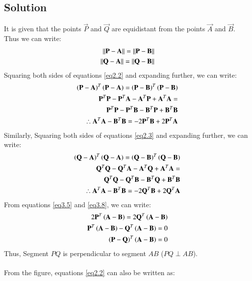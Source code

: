 \documentclass[journal,12pt,twocolumn]{IEEEtran}
\begin{document}
\subsection{Solution}
\noindent It is given that the points $\vec{P}$ and $\vec{Q}$  are equidistant from the points $\vec{A}$ and $\vec{B}$. Thus we can write:
\begin{align}
    \left\lVert\mathbf{P}-\mathbf{A}\right\rVert=\left\lVert\mathbf{P}-\mathbf{B}\right\rVert \label{eq2.2}\\
    \left\lVert\mathbf{Q}-\mathbf{A}\right\rVert=\left\lVert\mathbf{Q}-\mathbf{B}\right\rVert \label{eq2.3}
\end{align}
Squaring both sides of equations \ref{eq2.2} and expanding further, we can write:
\begin{align}
    \left(\mathbf{P}-\mathbf{A}\right)^T\left(\mathbf{P}-\mathbf{A}\right)=\left(\mathbf{P}-\mathbf{B}\right)^T\left(\mathbf{P}-\mathbf{B}\right) \\
    \mathbf{P}^T\mathbf{P}-\mathbf{P}^T\mathbf{A}-\mathbf{A}^T\mathbf{P}+\mathbf{A}^T\mathbf{A}= \nonumber \\ 
     \mathbf{P}^T\mathbf{P}-\mathbf{P}^T\mathbf{B}-\mathbf{B}^T\mathbf{P}+\mathbf{B}^T\mathbf{B} \\
     \therefore \mathbf{A}^T\mathbf{A}-\mathbf{B}^T\mathbf{B}=-2\mathbf{P}^T\mathbf{B}+2\mathbf{P}^T\mathbf{A}\label{eq3.5}
\end{align}
Similarly, Squaring both sides of equations \ref{eq2.3} and expanding further, we can write:
\begin{align}
    \left(\mathbf{Q}-\mathbf{A}\right)^T\left(\mathbf{Q}-\mathbf{A}\right)=\left(\mathbf{Q}-\mathbf{B}\right)^T\left(\mathbf{Q}-\mathbf{B}\right) \\
    \mathbf{Q}^T\mathbf{Q}-\mathbf{Q}^T\mathbf{A}-\mathbf{A}^T\mathbf{Q}+\mathbf{A}^T\mathbf{A}= \nonumber \\ 
     \mathbf{Q}^T\mathbf{Q}-\mathbf{Q}^T\mathbf{B}-\mathbf{B}^T\mathbf{Q}+\mathbf{B}^T\mathbf{B} \\
     \therefore \mathbf{A}^T\mathbf{A}-\mathbf{B}^T\mathbf{B}=-2\mathbf{Q}^T\mathbf{B}+2\mathbf{Q}^T\mathbf{A}\label{eq3.8}
\end{align}
From equations \ref{eq3.5} and \ref{eq3.8}, we can write:
\begin{align}
    2\mathbf{P}^T\left(\mathbf{A}-\mathbf{B}\right)=2\mathbf{Q}^T\left(\mathbf{A}-\mathbf{B}\right)\\
    \mathbf{P}^T\left(\mathbf{A}-\mathbf{B}\right)-\mathbf{Q}^T\left(\mathbf{A}-\mathbf{B}\right)=0\\
    \left(\mathbf{P}-\mathbf{Q}\right)^T\left(\mathbf{A}-\mathbf{B}\right)=0
\end{align}
Thus, Segment $PQ$ is perpendicular to segment $AB$ ($PQ \perp AB$).\\ \\
From the figure, equations \ref{eq2.2} can also be written as:
\end{document}
